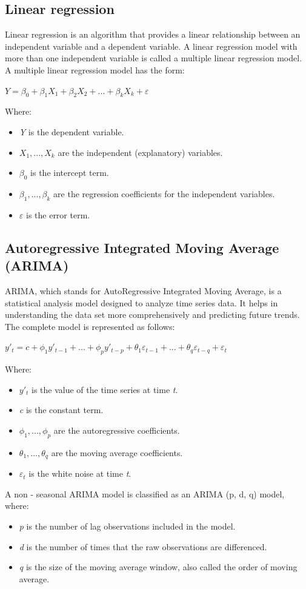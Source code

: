\documentclass{ieeeojies}
\begin{document}
\subsection{Linear regression}
Linear regression is an algorithm that provides a linear relationship between an independent variable and a dependent variable. A linear regression model with more than one independent variable is called a multiple linear regression model. A multiple linear regression model has the form:
\newline  \centerline{$\textit{Y} = \beta_{0} + \beta_{1}X_{1} + \beta_{2}X_{2} + ... + \beta_{k}X_{k} + \varepsilon$}
\newline Where:
\begin{itemize}
	\item \textit{Y} is the dependent variable.
	\item $X_{1},...,X_{k}$ are the independent (explanatory) variables.
	\item $\beta_{0}$ is the intercept term.
	\item $\beta_{1},...,\beta_{k}$ are the regression coefficients for the independent variables.
	\item $\varepsilon$ is the error term.
\end{itemize}
\subsection{Autoregressive Integrated Moving Average (ARIMA)}
ARIMA, which stands for AutoRegressive Integrated Moving Average, is a statistical analysis model designed to analyze time series data. It helps in understanding the data set more comprehensively and predicting future trends. The complete model is represented as follows:
\newline \centerline{$y'_{t} = c + \phi_{1}y'_{t-1} + ... + \phi_{p}y'_{t-p} + \theta_{1}\varepsilon_{t-1} + ... + \theta_{q}\varepsilon_{t-q} + \varepsilon_{t}$}
\newline Where:
\begin{itemize}
	\item $y'_{t}$ is the value of the time series at time \textit{t}.
	\item \textit{c} is the constant term.
	\item $\phi_{1},...,\phi_{p}$ are the autoregressive coefficients.
	\item $\theta_{1},...,\theta_{q}$ are the moving average coefficients.
	\item $\varepsilon_{t}$ is the white noise at time \textit{t}.
\end{itemize}
A non - seasonal ARIMA model is classified as an ARIMA (p, d, q) model, where:
\begin{itemize}
	\item \textit{p} is the number of lag observations included in the model.
	\item \textit{d} is the number of times that the raw observations are differenced.
	\item \textit{q} is the size of the moving average window, also called the order of moving average.
\end{itemize}
\end{document}
